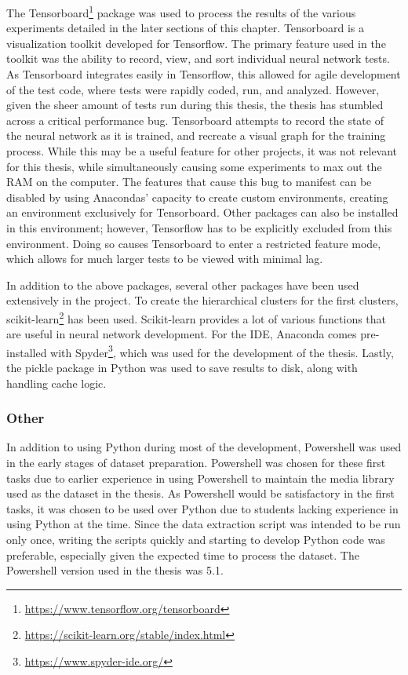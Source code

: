 The Tensorboard\footnote{\url{https://www.tensorflow.org/tensorboard}} package was used to process the results of the various experiments detailed in the later sections of this chapter.
Tensorboard is a visualization toolkit developed for Tensorflow.
The primary feature used in the toolkit was the ability to record, view, and sort individual neural network tests.
As Tensorboard integrates easily in Tensorflow, this allowed for agile development of the test code, where tests were rapidly coded, run, and analyzed.
However, given the sheer amount of tests run during this thesis, the thesis has stumbled across a critical performance bug.
Tensorboard attempts to record the state of the neural network as it is trained, and recreate a visual graph for the training process.
While this may be a useful feature for other projects, it was not relevant for this thesis, while simultaneously causing some experiments to max out the RAM on the computer.
The features that cause this bug to manifest can be disabled by using Anacondas' capacity to create custom environments, creating an environment exclusively for Tensorboard.
Other packages can also be installed in this environment; however, Tensorflow has to be explicitly excluded from this environment.
Doing so causes Tensorboard to enter a restricted feature mode, which allows for much larger tests to be viewed with minimal lag.

In addition to the above packages, several other packages have been used extensively in the project.
To create the hierarchical clusters for the first clusters, scikit-learn\footnote{\url{https://scikit-learn.org/stable/index.html}} has been used.
Scikit-learn provides a lot of various functions that are useful in neural network development.
For the IDE, Anaconda comes pre-installed with Spyder\footnote{\url{https://www.spyder-ide.org/}}, which was used for the development of the thesis.
Lastly, the pickle package in Python was used to save results to disk, along with handling cache logic.


\subsubsection{Other}
In addition to using Python during most of the development, Powershell was used in the early stages of dataset preparation.
Powershell was chosen for these first tasks due to earlier experience in using Powershell to maintain the media library used as the dataset in the thesis.
As Powershell would be satisfactory in the first tasks, it was chosen to be used over Python due to students lacking experience in using Python at the time.
Since the data extraction script was intended to be run only once, writing the scripts quickly and starting to develop Python code was preferable, especially given the expected time to process the dataset.
The Powershell version used in the thesis was 5.1.

